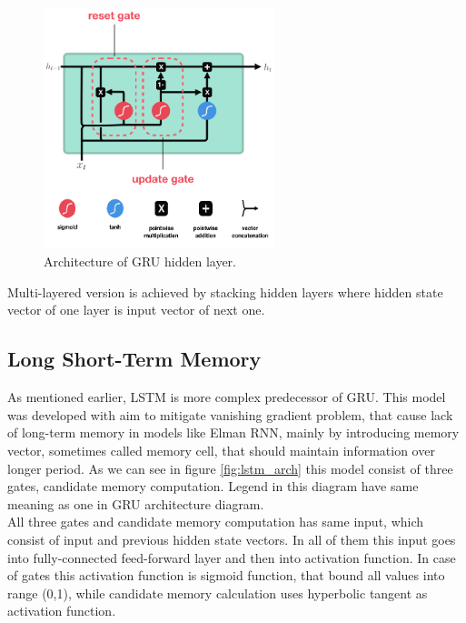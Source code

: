 \begin{figure}[!h]
	\centering
	
	\includegraphics[width=0.6\textwidth]{images/GRU_arch.png}
	
	\caption{Architecture of GRU hidden layer.}
	\label{fig:gru_arch}
\end{figure}

Multi-layered version is achieved by stacking hidden layers where hidden state vector of one layer is input vector of next one.

\subsection{Long Short-Term Memory}

As mentioned earlier, LSTM is more complex predecessor of GRU. This model was developed with aim to mitigate vanishing gradient problem, that cause lack of long-term memory in models like Elman RNN, mainly by introducing memory vector, sometimes called memory cell, that should maintain information over longer period. As we can see in figure \ref{fig:lstm_arch} this model consist of three gates, candidate memory computation. Legend in this diagram have same meaning as one in GRU architecture diagram.
\\

All three gates and candidate memory computation has same input, which consist of input and previous hidden state vectors. In all of them this input goes into fully-connected feed-forward layer and then into activation function. In case of gates this activation function is sigmoid function, that bound all values into range (0,1), while candidate memory calculation uses hyperbolic tangent as activation function.
\\

